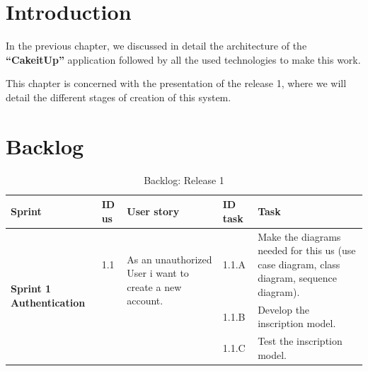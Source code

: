 \documentclass[12pt,a4paper]{report}
\begin{document}
	\section*{Introduction}
	In the previous chapter, we discussed in detail the architecture of the \textbf{``CakeitUp''} application followed by all the used technologies to make this work.\par 
	This chapter is concerned with the presentation of the release 1, where we will detail the different stages of creation of this system.
	\section{Backlog}

	\begin{table}[H]
		\begin{center}
			\captionsetup[table]{skip=10pt}
			\caption{Backlog: Release 1}
			\setlength\doublerulesep{0.5pt}
			\begin{tabular}{|  p{3cm}|  p{1cm}| p{4cm}|  p{1cm}| p{6cm}|}
				\hline 
				\rowcolor{LightCyan}
				 \textbf{Sprint} & \textbf{ID \ac{us}} & \textbf{User story} & \textbf{ID task} & \textbf{Task} 
				\\ \hline
				\multirow{5}{3cm}{\textbf{Sprint 1} \textbf{Authentication} }
				&                       
				1.1  &  
				\multirow{2}{4cm}{As an unauthorized User i want to create a new account.}
				              
				&				                      
				1.1.A &                        
				Make the diagrams needed for this \ac{us} (use case diagram, class diagram, sequence diagram).
				\\ 
				\cline{4-5}    
				&                   
			      &                                 
				&                        
				1.1.B &                        
				Develop the inscription model.
				\\ 
				\cline{4-5}    
				&                   
				&                                 
				&                        
				1.1.C &                        
				Test the inscription model.
			
				
				
			\end{tabular}
			
		\end{center}
		
	\end{table}
\end{document}
